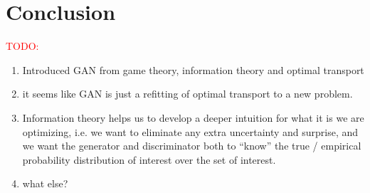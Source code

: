 \section{Conclusion}

\textcolor{red}{TODO:}

\begin{enumerate}
\item Introduced GAN from game theory, information theory and optimal
  transport
\item it seems like GAN is just a refitting of optimal transport to a
  new problem.
\item Information theory helps us to develop a deeper intuition for
  what it is we are optimizing, i.e. we want to eliminate any extra
  uncertainty and surprise, and we want the generator and
  discriminator both to  ``know'' the true / empirical probability
  distribution of interest over the set of interest.
\item what else?
\end{enumerate}

